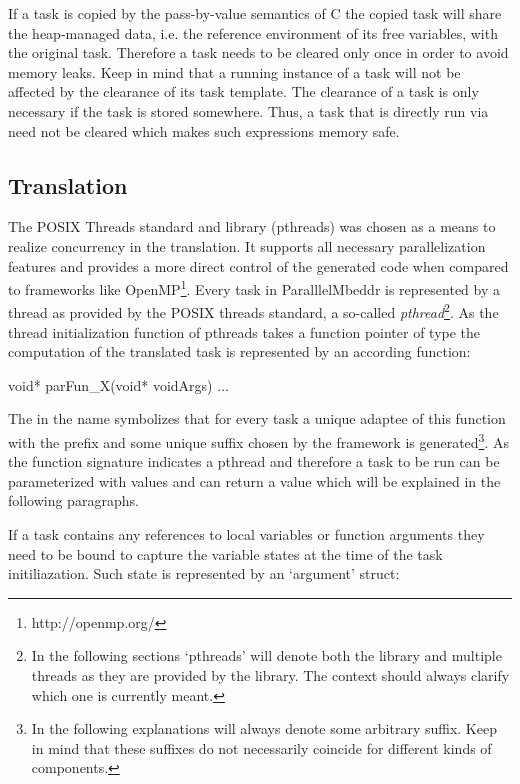 If a task is copied by the pass-by-value semantics of C the copied task will share the heap-managed data, i.e. the reference environment of its free variables, with the original task. Therefore a task needs to be cleared only once in order to avoid memory leaks. Keep in mind that a running instance of a task will not be affected by the clearance of its task template. The clearance of a task is only necessary if the task is stored somewhere. Thus, a task that is directly run via  need not be cleared which makes such expressions memory safe.

\subsection{Translation}
\label{tasksTranslation}
The POSIX Threads standard and library (pthreads) was chosen as a means to realize concurrency in the translation. It supports all necessary parallelization features and provides a more direct control of the generated code when compared to frameworks like OpenMP\footnote{http://openmp.org/}. Every task in ParalllelMbeddr is represented by a thread as provided by the POSIX threads standard, a so-called \textit{pthread}\footnote{In the following sections `pthreads' will denote both the library and multiple threads as they are provided by the library. The context should always clarify which one is currently meant.}. As the thread initialization function of pthreads takes a function pointer of type  the computation of the translated task is represented by an according function:
\begin{ccode}
void* parFun_X(void* voidArgs) {...}
\end{ccode}

The  in the name symbolizes that for every task a unique adaptee of this function with the prefix  and some unique suffix chosen by the framework is generated\footnote{In the following explanations  will always denote some arbitrary suffix. Keep in mind that these suffixes do not necessarily coincide for different kinds of components.}. As the function signature indicates a pthread and therefore a task to be run can be parameterized with values and can return a value which will be explained in the following paragraphs.

If a task contains any references to local variables or function arguments they need to be bound to capture the variable states at the time of the task initiliazation. Such state is represented by an `argument' struct:


